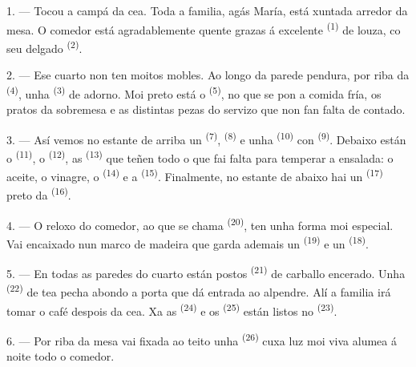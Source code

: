 \VUsaut{3.6mm}
\VUsaut{3.0mm}

1. --- Tocou a campá da cea. Toda a familia, agás María, está xuntada arredor da mesa. O
comedor está agradablemente quente grazas á excelente  \textsuperscript{(1)} de
louza, co seu  delgado \textsuperscript{(2)}.

2. --- Ese cuarto non ten moitos mobles. Ao longo da parede pendura, por riba da
 \textsuperscript{(4)}, unha 
\textsuperscript{(3)} de adorno. Moi preto está o  \textsuperscript{(5)}, no
que se pon a comida fría, os pratos da sobremesa e as distintas pezas do servizo que non fan
falta de contado.

3. --- Así vemos no estante de arriba un  \textsuperscript{(7)},
 \textsuperscript{(8)} e unha  \textsuperscript{(10)} con
 \textsuperscript{(9)}. Debaixo están o 
\textsuperscript{(11)}, o  \textsuperscript{(12)}, as
 \textsuperscript{(13)} que teñen todo o que fai falta para
temperar a ensalada: o aceite, o vinagre, o  \textsuperscript{(14)} e a
 \textsuperscript{(15)}. Finalmente, no estante de abaixo hai un
 \textsuperscript{(17)} preto da 
\textsuperscript{(16)}.

4. --- O reloxo do comedor, ao que se chama  \textsuperscript{(20)},
ten unha forma moi especial. Vai encaixado nun marco de madeira que garda ademais un
 \textsuperscript{(19)} e un
 \textsuperscript{(18)}.

\VUsaut{4.6mm}
\VUsaut{3.0mm}

5. --- En todas as paredes do cuarto están postos 
\textsuperscript{(21)} de carballo encerado. Unha 
\textsuperscript{(22)} de tea pecha abondo a porta que dá entrada ao alpendre. Alí a familia
irá tomar o café despois da cea. Xa as  \textsuperscript{(24)} e os
 \textsuperscript{(25)} están listos no
 \textsuperscript{(23)}.

6. --- Por riba da mesa vai fixada ao teito unha 
\textsuperscript{(26)} cuxa luz moi viva alumea á noite todo o comedor.

